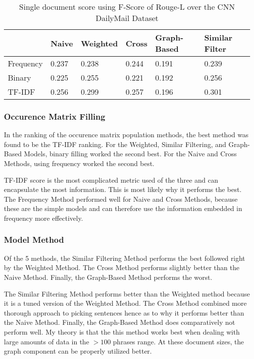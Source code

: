 \documentclass[../writeup.tex]{subfiles}
\begin{document}
\begin{table}[]
    \centering
    \begin{tabular}{l l l l l l }
        \hline
                  & Naive & Weighted & Cross & Graph-Based & Similar Filter \\ \hline
        Frequency & 0.237 & 0.238    & 0.244 & 0.191       & 0.239          \\
        Binary    & 0.225 & 0.255    & 0.221 & 0.192       & 0.256          \\
        TF-IDF    & 0.256 & 0.299    & 0.257 & 0.196       & 0.301          \\
    \end{tabular}
    \caption{Single document score using F-Score of Rouge-L over the CNN DailyMail Dataset}
    \label{david:table:singledoc}
\end{table}

\subsubsection{Occurence Matrix Filling}\label{david:sec:experiments:singledocument:matrix}

In the ranking of the occurence matrix population methods, the best method was found to be the TF-IDF ranking.
For the Weighted, Similar Filtering, and Graph-Based Models, binary filling worked the second best. For the Naive and Cross Methods, using frequency worked the second best.

TF-IDF score is the most complicated metric used of the three and can encapsulate the most information. This is most likely why it performs the best.
The Frequency Method performed well for Naive and Cross Methods, because these are the simple models and can therefore use the information embedded in frequency more effectively.

\subsubsection{Model Method}\label{david:sec:experiments:singledocument:method}

Of the 5 methods, the Similar Filtering Method performs the best followed right by the Weighted Method. The Cross Method performs slightly better than the Naive Method. Finally, the Graph-Based Method performs the worst.

The Similar Filtering Method performs better than the Weighted method because it is a tuned version of the Weighted Method. The Cross Method combined more thorough approach to picking sentences hence as to why it performs better than the Naive Method.
Finally, the Graph-Based Method does comparatively not perform well. My theory is that the this method works best when dealing with large amounts of data in the $>100$ phrases range. At these document sizes, the graph component can be properly utilized better.
\end{document}
